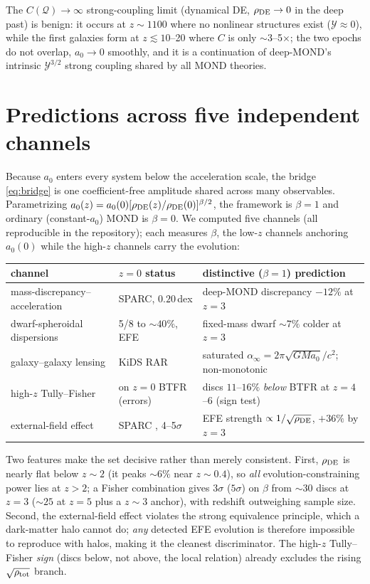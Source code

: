 \documentclass[11pt]{article}
\newcommand{\az}{a_0}
\newcommand{\rde}{\rho_{\rm DE}}
\begin{document}
The $C(\mathcal{Q})\to\infty$ strong-coupling limit (dynamical DE, $\rde\to0$ in the deep past) is benign: it occurs
at $z\sim1100$ where no nonlinear structures exist ($\mathcal{Y}\!\approx\!0$), while the first galaxies form at
$z\lesssim10$--20 where $C$ is only $\sim$3--5$\times$; the two epochs do not overlap, $\az\to0$ smoothly, and it is a
continuation of deep-MOND's intrinsic $\mathcal{Y}^{3/2}$ strong coupling shared by all MOND theories.

\section{Predictions across five independent channels}
\label{sec:predictions}
Because $\az$ enters every system below the acceleration scale, the bridge \eqref{eq:bridge} is one
coefficient-free amplitude shared across many observables. Parametrizing $\az(z)=\az(0)[\rde(z)/\rde(0)]^{\beta/2}$,
the framework is $\beta=1$ and ordinary (constant-$\az$) MOND is $\beta=0$. We computed five channels (all
reproducible in the repository); each measures $\beta$, the low-$z$ channels anchoring $\az(0)$ while the high-$z$
channels carry the evolution:
\begin{center}\small
\begin{tabular}{lll}
\toprule
channel & $z=0$ status & distinctive ($\beta{=}1$) prediction\\
\midrule
mass-discrepancy--acceleration & SPARC, $0.20$\,dex & deep-MOND discrepancy $-12\%$ at $z{=}3$\\
dwarf-spheroidal dispersions & 5/8 to ${\sim}40\%$, EFE & fixed-mass dwarf ${\sim}7\%$ colder at $z{=}3$\\
galaxy--galaxy lensing & KiDS RAR \cite{Brouwer2021} & saturated $\alpha_\infty{=}2\pi\sqrt{GM\az}/c^2$; non-monotonic\\
high-$z$ Tully--Fisher & on $z{=}0$ BTFR (errors) & discs $11$--$16\%$ \emph{below} BTFR at $z{=}4$--6 (sign test)\\
external-field effect & SPARC \cite{Chae2020}, 4--5$\sigma$ & EFE strength $\propto1/\sqrt{\rde}$, $+36\%$ by $z{=}3$\\
\bottomrule
\end{tabular}
\end{center}
Two features make the set decisive rather than merely consistent. First, $\rde$ is nearly flat below $z\sim2$ (it
peaks ${\sim}6\%$ near $z\sim0.4$), so \emph{all} evolution-constraining power lies at $z>2$; a Fisher combination
gives $3\sigma$ ($5\sigma$) on $\beta$ from ${\sim}30$ discs at $z=3$ (${\sim}25$ at $z=5$ plus a $z\sim3$ anchor),
with redshift outweighing sample size. Second, the external-field effect violates the strong equivalence principle,
which a dark-matter halo cannot do; \emph{any} detected EFE evolution is therefore impossible to reproduce with
halos, making it the cleanest discriminator. The high-$z$ Tully--Fisher \emph{sign} (discs below, not above, the
local relation) already excludes the rising $\sqrt{\rho_{\rm tot}}$ branch.
\end{document}
